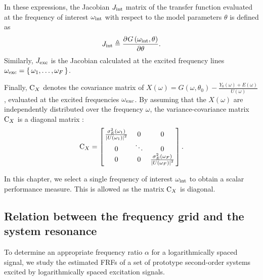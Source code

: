   In these expressions, the Jacobian $J_{\mathrm{int}}$ matrix of the transfer function evaluated at the frequency of interest $\omega_{\mathrm{int}}$ with respect to the model parameters $\theta$ is defined as
  \begin{equation}
    J_{\mathrm{int}} \triangleq
         \frac{{\partial}^{} G\left( \omega_{\mathrm{int}}, \theta \right) }{\partial \theta}
    \text{.}
  \end{equation}
  Similarly, $J_{\mathrm{exc}}$ is the Jacobian calculated at the excited frequency lines $\omega_{\mathrm{exc}} = \set{\omega_1, \ldots, \omega_F}$.

  Finally, $\mathrm{C}_{X}$ denotes the covariance matrix of $X\left(\omega\right) = G\left(\omega, \theta_0 \right) - \frac{Y_0\left(\omega \right) + E\left( \omega \right)  }{ U\left( \omega \right) } $, evaluated at the excited frequencies $\omega_{\mathrm{exc}}$.
  By assuming that the $X\left( \omega \right) $ are independently distributed over the frequency $\omega$, the variance-covariance matrix $\mathrm{C}_{X}$ is a diagonal matrix \citep{Pintelon2012}:
  \begin{equation}
    \mathrm{C}_{X} =
               \left[ \left.
               \begin{matrix}
                 \frac{\sigma^2_E\left(\omega_1 \right) }
                      {\left|  U\left(\omega_1 \right) \right|^2 } & 0 & 0 \\
                 0 & \ddots & 0 \\
                 0 & 0 & \frac{\sigma^2_E\left(\omega_F \right) }
                              {\left| U\left(\omega_F \right) \right|^2 }
               \end{matrix}
               \right.^{\vphantom{x}}\right]
    \text{.}
  \end{equation}

  In this chapter, we select a single frequency of interest $\omega_{\mathrm{int}}$
  to obtain a scalar performance measure.
  This is allowed as the matrix $\mathrm{C}_{X}$ is diagonal.

  \subsection{Relation between the frequency grid and the system resonance} \label{sec:relationLogGridSystem}
  To determine an appropriate frequency ratio $\alpha$ for a logarithmically spaced signal, we study the estimated \glspl{FRF} of a set of prototype second-order systems excited by logarithmically spaced excitation signals.

